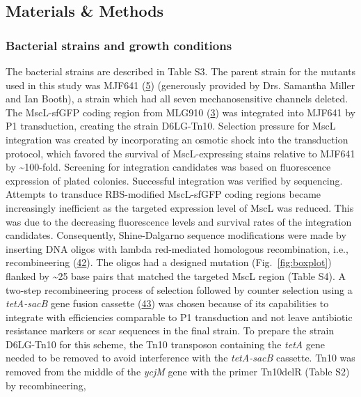 \subsection{Materials
\&
Methods}\label{materials-methods}

\subsubsection{Bacterial
strains
and
growth
conditions}\label{bacterial-strains-and-growth-conditions}

The
bacterial
strains
are
described
in
Table
S3.
The
parent
strain
for
the
mutants
used
in
this
study
was
MJF641
(\protect\hyperlink{ref-edwards2012}{5})
(generously
provided
by
Drs.
Samantha
Miller
and
Ian
Booth),
a
strain
which
had
all
seven
mechanosensitive
channels
deleted.
The
MscL-sfGFP
coding
region
from
MLG910
(\protect\hyperlink{ref-bialecka-fornal2012}{3})
was
integrated
into
MJF641
by P1
transduction,
creating
the
strain
D6LG-Tn10.
Selection
pressure
for
MscL
integration
was
created
by
incorporating
an
osmotic
shock
into
the
transduction
protocol,
which
favored
the
survival
of
MscL-expressing
stains
relative
to
MJF641
by
\textasciitilde{}100-fold.
Screening
for
integration
candidates
was
based
on
fluorescence
expression
of
plated
colonies.
Successful
integration
was
verified
by
sequencing.
Attempts
to
transduce
RBS-modified
MscL-sfGFP
coding
regions
became
increasingly
inefficient
as the
targeted
expression
level
of
MscL
was
reduced.
This
was
due to
the
decreasing
fluorescence
levels
and
survival
rates
of the
integration
candidates.
Consequently,
Shine-Dalgarno
sequence
modifications
were
made
by
inserting
DNA
oligos
with
lambda
red-mediated
homologous
recombination,
i.e.,
recombineering
(\protect\hyperlink{ref-sharan2009}{42}).
The
oligos
had a
designed
mutation
(Fig.~\ref{fig:boxplot})
flanked
by
\textasciitilde{}25
base
pairs
that
matched
the
targeted
MscL
region
(Table
S4). A
two-step
recombineering
process
of
selection
followed
by
counter
selection
using
a
\emph{tetA-sacB}
gene
fusion
cassette
(\protect\hyperlink{ref-li2013}{43})
was
chosen
because
of its
capabilities
to
integrate
with
efficiencies
comparable
to P1
transduction
and
not
leave
antibiotic
resistance
markers
or
scar
sequences
in the
final
strain.
To
prepare
the
strain
D6LG-Tn10
for
this
scheme,
the
Tn10
transposon
containing
the
\emph{tetA}
gene
needed
to be
removed
to
avoid
interference
with
the
\emph{tetA-sacB}
cassette.
Tn10
was
removed
from
the
middle
of the
\emph{ycjM}
gene
with
the
primer
Tn10delR
(Table
S2) by
recombineering,
